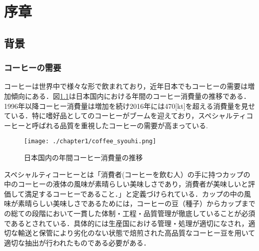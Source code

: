 
\chapter{序章}

\setcounter{page}{1}


\section{背景}

\subsection{コーヒーの需要}
コーヒーは世界中で様々な形で飲まれており，近年日本でもコーヒーの需要は増加傾向にある．図\ref{fig_syouhi}は日本国内における年間のコーヒー消費量の推移である．1996年以降コーヒー消費量は増加を続け2016年には470[kt]を超える消費量を見せている．特に嗜好品としてのコーヒーがブームを迎えており，スペシャルティコーヒーと呼ばれる品質を重視したコーヒーの需要が高まっている.
\begin{figure}[htbp]
  \begin{center}
    \texttt{[image: ./chapter1/coffee\_syouhi.png]}
    \caption{日本国内の年間コーヒー消費量の推移}
    \label{fig_syouhi}
  \end{center}
\end{figure}

スペシャルティコーヒーとは「消費者(コーヒーを飲む人）の手に持つカップの中のコーヒーの液体の風味が素晴らしい美味しさであり，消費者が美味しいと評価して満足するコーヒーであること．」と定義づけられている．カップの中の風味が素晴らしい美味しさであるためには，コーヒーの豆（種子）からカップまでの総ての段階において一貫した体制・工程・品質管理が徹底していることが必須であるとされている．具体的には生産国における管理・処理が適切になされ，適切な輸送と保管により劣化のない状態で焙煎された高品質なコーヒー豆を用いて適切な抽出が行われたものである必要がある\cite{horiguchi}．

